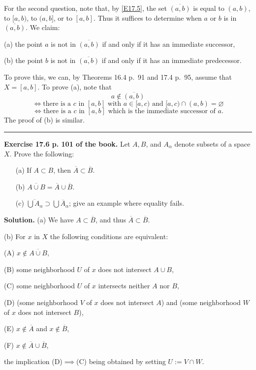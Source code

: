 \documentclass[12pt,letterpaper]{article}
\newcommand{\hs}{\bigskip\hrule\medskip}
\newcommand{\noi}{\noindent}%
\begin{document}
For the second question, note that, by \eqref{E17.5}, the set $\overline{(a,b)}$ is equal to $(a,b)$, to $[a,b)$, to $(a,b]$, or to $[a,b]$. Thus it suffices to determine when $a$ or $b$ is in $\overline{(a,b)}$. We claim: 

(a) the point $a$ is not in $\overline{(a,b)}$ if and only if it has an immediate successor, 

(b) the point $b$ is not in $\overline{(a,b)}$ if and only if it has an immediate predecessor. 

\noi To prove this, we can, by Theorems 16.4 p.~91 and 17.4 p.~95, assume that $X=[a,b]$. To prove (a), note that 
$$
a\notin\overline{(a,b)}
$$ 
$$
\iff\text{there is a $c$ in $[a,b]$ with $a\in[a,c)$ and }[a,c)\cap(a,b)=\varnothing
$$ 
$$
\iff\text{there is a $c$ in $[a,b]$ which is the immediate successor of $a$.}
$$ 
The proof of (b) is similar. 

\hs

\noi\textbf{Exercise 17.6 p. 101 of the book.} Let $A, B$, and $A_{\alpha}$ denote subsets of a space $X$. Prove the following:
\begin{enumerate}
    \item[(a)] If $A \subset B$, then $\overline{A} \subset \overline{B}$.
    \item[(b)] $\overline{A \cup B}=\overline{A}\cup\overline{B}$.
    \item[(c)] $\overline{\bigcup A_{\alpha}} \supset \bigcup \overline{A}_{\alpha}$; give an example where equality fails.
\end{enumerate}

\noi\textbf{Solution.} (a) We have $A\subset\overline B$, and thus $\overline{A} \subset \overline{B}$. 

\noi(b) For $x$ in $X$ the following conditions are equivalent: 

\noi(A) $x\notin\overline{A\cup B}$, 

\noi(B) some neighborhood $U$ of $x$ does not intersect $A\cup B$, 

\noi(C) some neighborhood $U$ of $x$ intersects neither $A$ nor $B$, 

\noi(D) (some neighborhood $V$ of $x$ does not intersect $A$) and (some neighborhood $W$ of $x$ does not intersect $B$), 

\noi(E) $x\notin\overline{A}$ and $x\notin\overline{B}$, 

\noi(F) $x\notin\overline{A}\cup\overline{B}$,

\noi the implication (D)$\implies$(C) being obtained by setting $U:=V\cap W$. %
\end{document}
